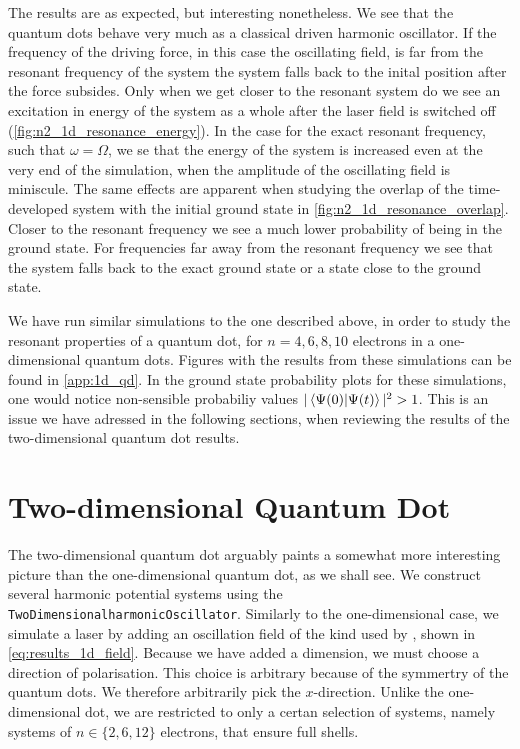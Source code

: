 The results are as expected, but interesting nonetheless. We see that the quantum dots 
behave very much as a classical driven harmonic oscillator. If the frequency of the driving
force, in this case the oscillating field, is far from the resonant frequency of the 
system the system falls back to the inital position after the force subsides. Only when we 
get closer to the resonant system do we see an excitation in energy of the system as 
a whole after the laser field is switched off (\autoref{fig:n2_1d_resonance_energy}).
In the case for the exact resonant frequency,
such that $\omega=\Omega$, we se that the energy of the system is increased even at the very 
end of the simulation, when the amplitude of the oscillating field is miniscule.
The same effects are apparent when studying the overlap of the time-developed system 
with the initial ground state in \autoref{fig:n2_1d_resonance_overlap}. Closer to the
resonant frequency we see a much lower probability of being in the ground state. For 
frequencies far away from the resonant frequency we see that the system falls back to 
the exact ground state or a state close to the ground state.

We have run similar simulations to the one described above, in order to study the 
resonant properties of a quantum dot, for $n=4,6,8,10$ electrons in a one-dimensional 
quantum dots. Figures with the results from these simulations can be found in 
\autoref{app:1d_qd}. In the ground state probability plots for these simulations, 
one would notice non-sensible probabiliy values $|\braket{\Psi(0)}{\Psi(t)}|^2 > 1$.
This is an issue we have adressed in the following sections, when reviewing the results 
of the two-dimensional quantum dot results.


\section{Two-dimensional Quantum Dot}

The two-dimensional quantum dot arguably paints a somewhat more interesting picture 
than the one-dimensional quantum dot, as we shall see. We construct several 
harmonic potential systems using the  \lstinline{TwoDimensionalharmonicOscillator}.
Similarly to the one-dimensional case, we simulate a laser by adding an 
oscillation field of the kind used by
\citeauthor{pedersen2019symplectic}\cite{pedersen2019symplectic}, shown 
in \autoref{eq:results_1d_field}. Because we have added a dimension, we must 
choose a direction of polarisation. This choice is arbitrary because of the 
symmertry of the quantum dots. We therefore arbitrarily pick the $x$-direction.
Unlike the one-dimensional dot, we are restricted to only a certan selection of 
systems, namely systems of $n\in\{2,6,12\}$ electrons, that ensure full shells.

